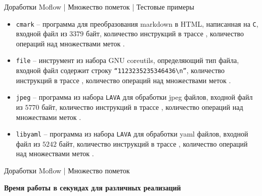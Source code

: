\documentclass[10pt]{beamer}
\begin{document}
\begin{frame}{Доработки Moflow | Множество пометок | Тестовые примеры}
\begin{itemize}
    \item \texttt{cmark} -- программа для преобразования markdown в HTML, написанная на \texttt{C}, входной файл из $3379$ байт, количество инструкций в трассе , количество операций над множествами меток .
    \item \texttt{file} -- инструмент из набора GNU coreutils, определяющий тип файла, входной файл содержит строку \texttt{``1123235235346436\textbackslash n''}, количество инструкций в трассе , количество операций над множествами меток .
    \item \texttt{jpeg} -- программа из набора \texttt{LAVA}  для обработки jpeg файлов, входной файл из $5770$ байт, количество инструкций в трассе , количество операций над множествами меток .
    \item \texttt{libyaml} -- программа из набора \texttt{LAVA} для обработки yaml файлов, входной файл из $5242$ байт, количество инструкций в трассе , количество операций над множествами меток .
\end{itemize}
\end{frame}

\begin{frame}{Доработки Moflow | Множество пометок}

    \textbf{Время работы в секундах для различных реализаций}\\
\end{frame}

\end{document}
